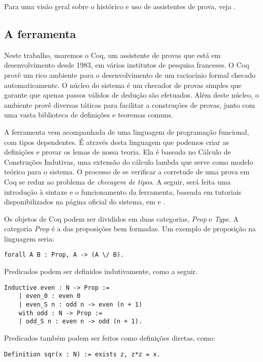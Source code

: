 Para uma visão geral sobre o histórico e uso de assistentes de prova, veja
\cite{proof_assist}. 

\subsection{A ferramenta}

Neste trabalho, usaremos o Coq, um assistente de provas que está em
desenvolvimento desde 1983, em vários institutos de pesquisa franceses. O Coq
provê um rico ambiente para o desenvolvimento de um raciocínio formal checado
automaticamente. O núcleo do sistema é um checador de provas simples que garante
que apenas passos válidos de dedução são efetuados. Além deste núcleo, o
ambiente provê diversas táticas para facilitar a construções de provas, junto
com uma vasta biblioteca de definições e teoremas comuns.

A ferramenta vem acompanhada de uma linguagem de programação funcional, com
tipos dependentes. É através desta linguagem que podemos criar as definições e
provar os lemas de nossa teoria. Ela é baseada no Cálculo de Construções
Indutivas, uma extensão do cálculo lambda que serve como modelo teórico para o
sistema. O processo de se verificar a corretude de uma prova em Coq se reduz ao
problema de \emph{checagem de tipos}. A seguir, será feita uma introdução à
sintaxe e o funcionamento da ferramenta, baseada em tutoriais disponibilizados
na página oficial do sistema, em \cite{coq} e \cite{coq2}.


Os objetos de Coq podem ser divididos em duas categorias, \emph{Prop} e
\emph{Type}. A categoria \emph{Prop} é a das proposições bem formadas. Um
exemplo de proposição na linguagem seria:

\begin{lstlisting}[basicstyle=\small]
    forall A B : Prop, A -> (A \/ B).
\end{lstlisting}

Predicados podem ser definidos indutivamente, como a seguir.

\begin{lstlisting}[basicstyle=\small]
    Inductive even : N -> Prop :=
    | even_0 : even 0
    | even_S n : odd n -> even (n + 1)
    with odd : N -> Prop :=
    | odd_S n : even n -> odd (n + 1).
\end{lstlisting}

Predicados também podem ser feitos como definições diretas, como:

\begin{lstlisting}[basicstyle=\small]
    Definition sqr(x : N) := exists z, z*z = x.
\end{lstlisting}

